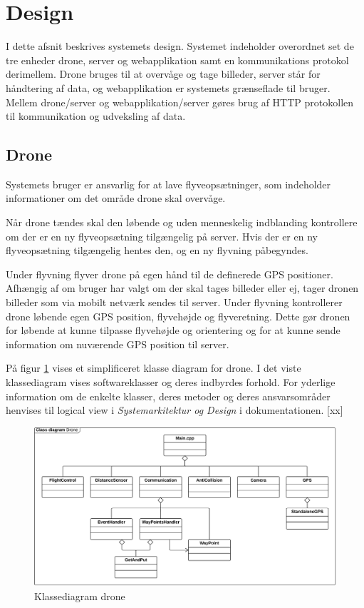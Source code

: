 \section{Design}

I dette afsnit beskrives systemets design. Systemet indeholder overordnet set de tre enheder drone, server og webapplikation samt en kommunikations protokol derimellem. Drone bruges til at overvåge og tage billeder, server står for håndtering af data, og webapplikation er systemets grænseflade til bruger. Mellem drone/server og webapplikation/server gøres brug af HTTP protokollen til kommunikation og udveksling af data.



\subsection{Drone}

Systemets bruger er ansvarlig for at lave flyveopsætninger, som indeholder informationer om det område drone skal overvåge.

Når drone tændes skal den løbende og uden menneskelig indblanding kontrollere om der er en ny flyveopsætning tilgængelig på server. Hvis der er en ny flyveopsætning tilgængelig hentes den, og en ny flyvning påbegyndes. 

Under flyvning flyver drone på egen hånd til de definerede GPS positioner. Afhængig af om bruger har valgt om der skal tages billeder eller ej, tager dronen billeder som via mobilt netværk sendes til server. 
Under flyvning kontrollerer drone løbende egen GPS position, flyvehøjde og flyveretning. Dette gør dronen for løbende at kunne tilpasse flyvehøjde og orientering og for at kunne sende information om nuværende GPS position til server.

På figur \ref{fig:class_drone} vises et simplificeret klasse diagram for drone. I det viste klassediagram vises softwareklasser og deres indbyrdes forhold. For yderlige information om de enkelte klasser, deres metoder og deres ansvarsområder henvises til logical view i \textit{Systemarkitektur og Design} i dokumentationen. [xx]

\begin{figure}[H]
\centering
\includegraphics[width=1\textwidth]{Billeder/Design_Class_drone.png}
\vspace{-0.5cm}
\caption{Klassediagram drone}
\label{fig:class_drone}
\end{figure}


